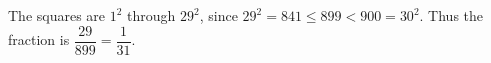 The squares are $1^2$ through $29^2$, since $29^2=841\le899<900=30^2$. Thus the fraction is $\dfrac{29}{899}=\boxed{\dfrac{1}{31}}$.
